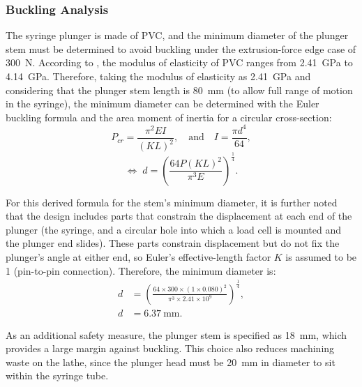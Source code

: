 \subsubsection*{Buckling Analysis}
The syringe plunger is made of PVC, and the minimum diameter of the plunger stem must be determined to avoid buckling under the extrusion-force edge case of \SI{300}{N}. According to \cite{callister2018materials}, the modulus of elasticity of PVC ranges from \SI{2.41}{\giga\pascal} to \SI{4.14}{\giga\pascal}. Therefore, taking the modulus of elasticity as \SI{2.41}{\giga\pascal} and considering that the plunger stem length is \SI{80}{mm} (to allow full range of motion in the syringe), the minimum diameter can be determined with the Euler buckling formula and the area moment of inertia for a circular cross-section:
\[
P_{cr} = \frac{\pi^{2} E I}{(K L)^{2}}, 
\quad \text{and} \quad 
I = \frac{\pi d^{4}}{64},
\]
\[
\Longleftrightarrow
\; d = \left( \frac{64 P (K L)^{2}}{\pi^{3} E} \right)^{\tfrac{1}{4}}.
\]

For this derived formula for the stem’s minimum diameter, it is further noted that the design includes parts that constrain the displacement at each end of the plunger (the syringe, and a circular hole into which a load cell is mounted and the plunger end slides). These parts constrain displacement but do not fix the plunger’s angle at either end, so Euler’s effective-length factor $K$ is assumed to be 1 (pin-to-pin connection). Therefore, the minimum diameter is:
\begin{align*}
d &= \left( \frac{64 \times 300 \times (1 \times 0.080)^{2}}{\pi^{3} \times 2.41 \times 10^{9}} \right)^{\tfrac{1}{4}},\\
d &= 6.37~\text{mm}.
\end{align*}

As an additional safety measure, the plunger stem is specified as \SI{18}{mm}, which provides a large margin against buckling. This choice also reduces machining waste on the lathe, since the plunger head must be \SI{20}{mm} in diameter to sit within the syringe tube.

